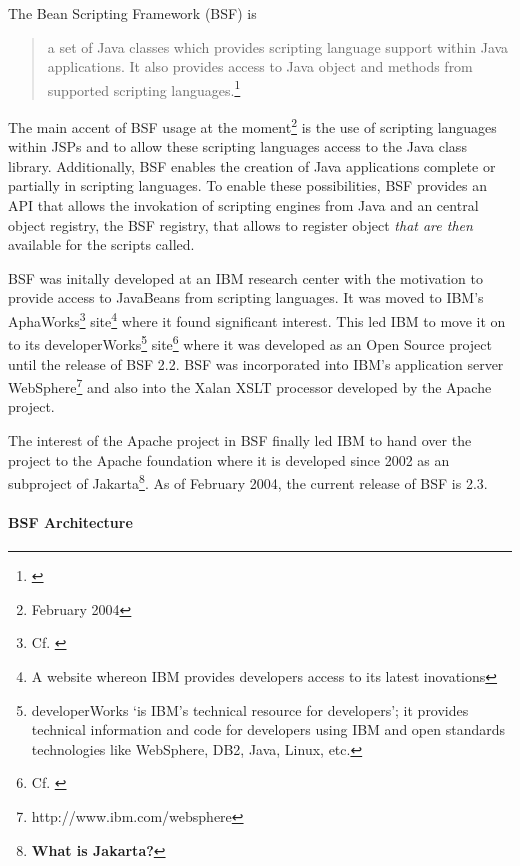 The Bean Scripting Framework (BSF) is

\begin{quotation}
	a set of Java classes which provides scripting language support within Java applications. It also provides access to Java object and methods from supported scripting languages.\footnote{\cite{BsfFaq}}
\end{quotation}

The main accent of BSF usage at the moment\footnote{February 2004} is the use of scripting languages within JSPs and to allow these scripting languages access to the Java class library. Additionally, BSF enables the creation of Java applications complete or partially in scripting languages. To enable these possibilities, BSF provides an API that allows the invokation of scripting engines from Java and an central object registry, the BSF registry, that allows to register object \emph{that are then} available for the scripts called.

BSF was initally developed at an IBM research center with the motivation to provide access to JavaBeans from scripting languages. It was moved to IBM's AphaWorks\footnote{Cf. \cite{IbmAlpha}} site\footnote{A website whereon IBM provides developers access to its latest inovations} where it found significant interest. This led IBM to move it on to its developerWorks\footnote{developerWorks `is IBM's technical resource for developers'\cite{IbmDevelAbout}; it provides technical information and code for developers using IBM and open standards technologies like WebSphere, DB2, Java, Linux, etc.}  site\footnote{Cf. \cite{IbmDevel}} where it was developed as an Open Source project until the release of BSF 2.2. BSF was incorporated into IBM's application server WebSphere\footnote{http://www.ibm.com/websphere} and also into the Xalan XSLT processor developed by the Apache project.

The interest of the Apache project in BSF finally led IBM to hand over the project to the Apache foundation where it is developed since 2002 as an subproject of Jakarta\footnote{\textbf{What is Jakarta?}}. As of February 2004, the current release of BSF is 2.3.

\paragraph{BSF Architecture}


